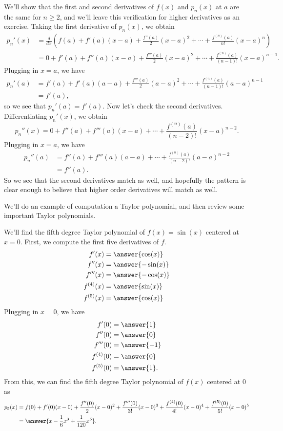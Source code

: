 \documentclass{ximera}
\begin{document}
We'll show that the first and second derivatives of $f(x)$ and $p_n(x)$ at $a$ are the same for $n\geq 2$, and we'll leave this verification for higher derivatives as an exercise. Taking the first derivative of $p_n(x)$, we obtain
\begin{align*}
p_n'(x) &=\frac{d}{dx}\left(f(a) + f'(a)(x-a) + \frac{f''(a)}{2}(x-a)^2+\cdots + \frac{f^{(n)}(a)}{n!}(x-a)^n\right)\\
&= 0 + f'(a) + f''(a)(x-a) + \frac{f'''(a)}{2}(x-a)^2 + \cdots + \frac{f^{(n)}(a)}{(n-1)!}(x-a)^{n-1}.
\end{align*}
Plugging in $x=a$, we have
\begin{align*}
p_n'(a) &= f'(a) + f'(a)(a-a) + \frac{f'''(a)}{2}(a-a)^2 + \cdots + \frac{f^{(n)}(a)}{(n-1)!}(a-a)^{n-1}\\
&= f'(a),
\end{align*}
so we see that $p_n'(a) = f'(a)$. Now let's check the second derivatives. Differentiating $p_n'(x)$, we obtain
\[
p_n''(x) = 0 + f''(a) + f'''(a)(x-a) + \cdots + \frac{f^{(n)}(a)}{(n-2)!}(x-a)^{n-2}.
\]
Plugging in $x=a$, we have
\begin{align*}
p_n''(a) &=f''(a) + f'''(a)(a-a) + \cdots + \frac{f^{(n)}(a)}{(n-2)!}(a-a)^{n-2}\\
&= f''(a).
\end{align*}
So we see that the second derivatives match as well, and hopefully the pattern is clear enough to believe that higher order derivatives will match as well.

We'll do an example of computation a Taylor polynomial, and then review some important Taylor polynomials.

\begin{example}
We'll find the fifth degree Taylor polynomial of $f(x) = \sin(x)$ centered at $x = 0$. First, we compute the first five derivatives of $f$.
\begin{align*}
f'(x) &= \answer{\cos(x)}\\
f''(x) &= \answer{-\sin(x)}\\
f'''(x) &= \answer{-\cos(x)}\\
f^{(4)}(x) &= \answer{\sin(x)}\\
f^{(5)}(x) &= \answer{\cos(x)}\\
\end{align*}
Plugging in $x = 0$, we have
\begin{align*}
f'(0) &= \answer{1}\\
f''(0) &= \answer{0}\\
f'''(0) &= \answer{-1}\\
f^{(4)}(0) &= \answer{0}\\
f^{(5)}(0) &= \answer{1}.\\
\end{align*}
From this, we can find the fifth degree Taylor polynomial of $f(x)$ centered at $0$ as
\begin{align*}
p_5(x) &= f(0) + f'(0)(x-0) + \frac{f''(0)}{2}(x-0)^2+ \frac{f'''(0)}{3!}(x-0)^3 +  \frac{f^{(4)}(0)}{4!}(x-0)^4 +  \frac{f^{(5)}(0)}{5!}(x-0)^5\\
&= \answer{x -\frac{1}{6}x^3+\frac{1}{120}x^5}.
\end{align*}
\end{example}
\end{document}
